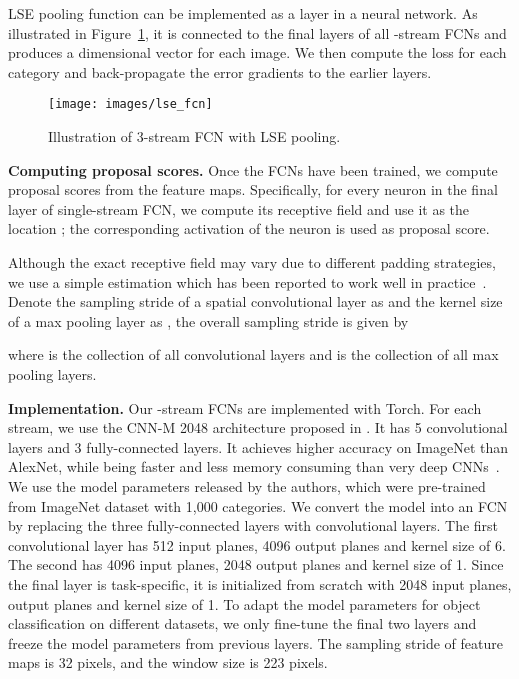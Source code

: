 \documentclass[10pt,twocolumn,letterpaper]{article}
\begin{document}
LSE pooling function can be implemented as a layer in a neural network. As illustrated in Figure~\ref{fig:lse}, it is connected to the final layers of all -stream FCNs and produces a  dimensional vector for each image. We then compute the loss for each category and back-propagate the error gradients to the earlier layers.

\begin{figure}
  \centering
    \texttt{[image: images/lse\_fcn]}
  \caption{Illustration of 3-stream FCN with LSE pooling.}
  \label{fig:lse}
\end{figure}



\textbf{Computing proposal scores.} Once the FCNs have been trained, we compute proposal scores  from the feature maps. Specifically, for every neuron in the final layer of single-stream FCN, we compute its receptive field and use it as the location ; the corresponding activation of the neuron is used as proposal score. 

Although the exact receptive field may vary due to different padding strategies, we use a simple estimation which has been reported to work well in practice~\cite{DBLP:journals/corr/SermanetEZMFL13}. Denote the sampling stride of a spatial convolutional layer  as  and the kernel size of a max pooling layer  as , the overall sampling stride  is given by

where  is the collection of all convolutional layers and  is the collection of all max pooling layers.





\textbf{Implementation.} Our -stream FCNs are implemented with Torch. For each stream, we use the CNN-M 2048 architecture proposed in \cite{DBLP:journals/corr/ChatfieldSVZ14}. It has 5 convolutional layers and 3 fully-connected layers. It achieves higher accuracy on ImageNet than AlexNet, while being faster and less memory consuming than very deep CNNs~\cite{Simonyan14c}. We use the model parameters released by the authors, which were pre-trained from ImageNet dataset with 1,000 categories. We convert the model into an FCN by replacing the three fully-connected layers with convolutional layers. The first convolutional layer has 512 input planes, 4096 output planes and kernel size of 6. The second has 4096 input planes, 2048 output planes and kernel size of 1. Since the final layer is task-specific, it is initialized from scratch with 2048 input planes,  output planes and kernel size of 1. To adapt the model parameters for object classification on different datasets, we only fine-tune the final two layers and freeze the model parameters from previous layers. The sampling stride of feature maps is 32 pixels, and the  window size is 223 pixels.
\end{document}
